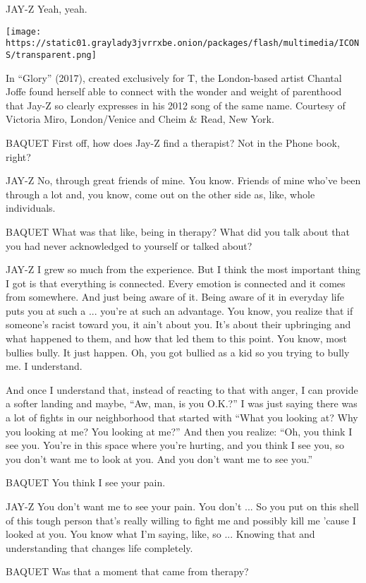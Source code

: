 JAY-Z Yeah, yeah.

\texttt{[image: https://static01.graylady3jvrrxbe.onion/packages/flash/multimedia/ICONS/transparent.png]}

In ``Glory'' (2017), created exclusively for T, the London-based artist
Chantal Joffe found herself able to connect with the wonder and weight
of parenthood that Jay-Z so clearly expresses in his 2012 song of the
same name. Courtesy of Victoria Miro, London/Venice and Cheim \& Read,
New York.

BAQUET First off, how does Jay-Z find a therapist? Not in the Phone
book, right?

JAY-Z No, through great friends of mine. You know. Friends of mine
who've been through a lot and, you know, come out on the other side as,
like, whole individuals.

BAQUET What was that like, being in therapy? What did you talk about
that you had never acknowledged to yourself or talked about?

JAY-Z I grew so much from the experience. But I think the most important
thing I got is that everything is connected. Every emotion is connected
and it comes from somewhere. And just being aware of it. Being aware of
it in everyday life puts you at such a ... you're at such an advantage.
You know, you realize that if someone's racist toward you, it ain't
about you. It's about their upbringing and what happened to them, and
how that led them to this point. You know, most bullies bully. It just
happen. Oh, you got bullied as a kid so you trying to bully me. I
understand.

And once I understand that, instead of reacting to that with anger, I
can provide a softer landing and maybe, ``Aw, man, is you O.K.?'' I was
just saying there was a lot of fights in our neighborhood that started
with ``What you looking at? Why you looking at me? You looking at me?''
And then you realize: ``Oh, you think I see you. You're in this space
where you're hurting, and you think I see you, so you don't want me to
look at you. And you don't want me to see you.''

BAQUET You think I see your pain.

JAY-Z You don't want me to see your pain. You don't ... So you put on
this shell of this tough person that's really willing to fight me and
possibly kill me 'cause I looked at you. You know what I'm saying, like,
so ... Knowing that and understanding that changes life completely.

BAQUET Was that a moment that came from therapy?

